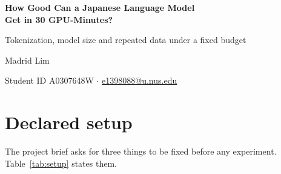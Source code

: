 \documentclass[11pt]{article}
\begin{document}
\begin{center}
{\LARGE\bfseries How Good Can a Japanese Language Model\\[3pt]
Get in 30 GPU-Minutes?\par}
\vspace{8pt}
{\large Tokenization, model size and repeated data under a fixed budget\par}
\vspace{14pt}
{\large Madrid Lim\par}
\vspace{3pt}
Student ID A0307648W \quad$\cdot$\quad
\href{mailto:e1398088@u.nus.edu}{e1398088@u.nus.edu}
\end{center}
\vspace{4pt}

\begin{abstract}
\noindent I train small Japanese language models from random weights, giving
each model exactly 30 minutes of training on one GPU, and ask how to spend that
budget. Across 12 such runs I find that: (1) splitting text into learned word
pieces (BPE) beats splitting it into characters or raw bytes; (2) the best model size is 10--25 million parameters, and the best single model
read 15--24 tokens of text per parameter, consistent with the rule of thumb of
\citet{hoffmann2022chinchilla};
and (3) for film-subtitle text, adding subtitles to the training mix helps
far more than adding Wikipedia, and repeating the same 24 million subtitle
tokens 11 times still helped slightly. I also test whether a model's surprise
at a sentence can rate its difficulty for learners of Japanese. It does not help: adding the model's surprise to sentence length does not
measurably improve predictions of a sentence's JLPT level, while adding the
share of kanji does. All code, configurations and results are at
\url{https://github.com/StarlightsJourney/tiny-japanese-lm}.
\end{abstract}

\section{Declared setup}

The project brief asks for three things to be fixed before any experiment.
Table~\ref{tab:setup} states them.
\end{document}

